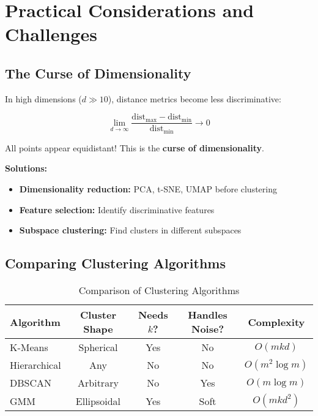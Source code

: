 \section{Practical Considerations and Challenges}

\subsection{The Curse of Dimensionality}

\begin{remark}
In high dimensions ($d \gg 10$), distance metrics become less discriminative:

\begin{equation}
    \lim_{d \to \infty} \frac{\text{dist}_{\max} - \text{dist}_{\min}}{\text{dist}_{\min}} \to 0
\end{equation}

All points appear equidistant! This is the \textbf{curse of dimensionality}.

\textbf{Solutions:}
\begin{itemize}
    \item \textbf{Dimensionality reduction:} PCA, t-SNE, UMAP before clustering
    \item \textbf{Feature selection:} Identify discriminative features
    \item \textbf{Subspace clustering:} Find clusters in different subspaces
\end{itemize}
\end{remark}

\subsection{Comparing Clustering Algorithms}

\begin{table}[h]
\centering
\caption{Comparison of Clustering Algorithms}
\begin{tabular}{|l|c|c|c|c|}
\hline
\textbf{Algorithm} & \textbf{Cluster Shape} & \textbf{Needs $k$?} & \textbf{Handles Noise?} & \textbf{Complexity} \\ \hline
K-Means & Spherical & Yes & No & $O(mkd)$ \\ \hline
Hierarchical & Any & No & No & $O(m^2 \log m)$ \\ \hline
DBSCAN & Arbitrary & No & Yes & $O(m \log m)$ \\ \hline
GMM & Ellipsoidal & Yes & Soft & $O(mkd^2)$ \\ \hline
\end{tabular}
\end{table}

